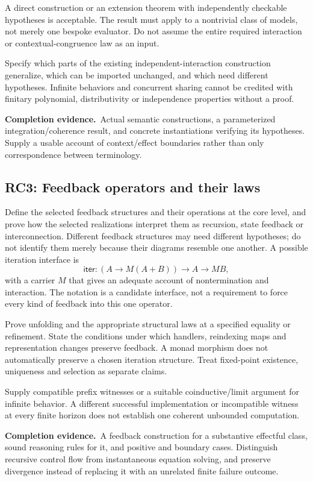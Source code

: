 \documentclass[11pt,a4paper]{article}
\newcommand{\deliver}{\par\textbf{Completion evidence.}\ }
\begin{document}
A direct construction or an extension theorem with independently checkable hypotheses is acceptable. The result must apply to a nontrivial class of models, not merely one bespoke evaluator. Do not assume the entire required interaction or contextual-congruence law as an input.

Specify which parts of the existing independent-interaction construction generalize, which can be imported unchanged, and which need different hypotheses. Infinite behaviors and concurrent sharing cannot be credited with finitary polynomial, distributivity or independence properties without a proof.

\deliver Actual semantic constructions, a parameterized integration/coherence result, and concrete instantiations verifying its hypotheses. Supply a usable account of context/effect boundaries rather than only correspondence between terminology.

\subsection*{RC3: Feedback operators and their laws}\label{rc3}
Define the selected feedback structures and their operations at the core level, and prove how the selected realizations interpret them as recursion, state feedback or interconnection. Different feedback structures may need different hypotheses; do not identify them merely because their diagrams resemble one another. A possible iteration interface is
\[
\mathsf{iter}:(A\to M(A+B))\to A\to MB,
\]
with a carrier \(M\) that gives an adequate account of nontermination and interaction. The notation is a candidate interface, not a requirement to force every kind of feedback into this one operator.

Prove unfolding and the appropriate structural laws at a specified equality or refinement. State the conditions under which handlers, reindexing maps and representation changes preserve feedback. A monad morphism does not automatically preserve a chosen iteration structure. Treat fixed-point existence, uniqueness and selection as separate claims.

Supply compatible prefix witnesses or a suitable coinductive/limit argument for infinite behavior. A different successful implementation or incompatible witness at every finite horizon does not establish one coherent unbounded computation.

\deliver A feedback construction for a substantive effectful class, sound reasoning rules for it, and positive and boundary cases. Distinguish recursive control flow from instantaneous equation solving, and preserve divergence instead of replacing it with an unrelated finite failure outcome.
\end{document}
